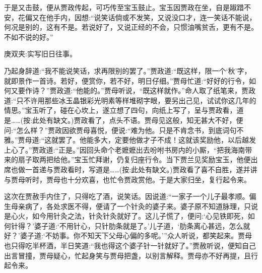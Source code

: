 \begin{parag}
    于是又击鼓，便从贾政传起，可巧传至宝玉鼓止。宝玉因贾政在坐，自是踧踖不安，花偏又在他手内，因想:“说笑话倘或不发笑，又说没口才，连一笑话不能说，何况是别的，这有不是。若说好了，又说正经的不会，只惯油嘴贫舌，更有不是。不如不说的好。”\begin{note}庚双夹:实写旧日往事。\end{note}乃起身辞道:“我不能说笑话，求再限别的罢了。”贾政道:“既这样，限一个‘秋’字，就即景作一首诗。若好，便赏你，若不好，明日仔细。”贾母忙道:“好好的行令，如何又要作诗？”贾政道:“他能的。”贾母听说，“既这样就作。”命人取了纸笔来，贾政道:“只不许用那些冰玉晶银彩光明素等样堆砌字眼，要另出己见，试试你这几年的情思。”宝玉听了，碰在心坎上，遂立想了四句，向纸上写了，呈与贾政看，道是……(按:此处有缺文。)贾政看了，点头不语。贾母见这般，知无甚大不好，便问:“怎么样？”贾政因欲贾母喜悦，便说:“难为他。只是不肯念书，到底词句不雅。”贾母道:“这就罢了。他能多大，定要他做才子不成！这就该奖励他，以后越发上心了。”贾政道:“正是。”因回头命个老嬷嬷出去吩咐书房内的小厮，“把我海南带来的扇子取两把给他。”宝玉忙拜谢，仍复归座行令。当下贾兰见奖励宝玉，他便出席也做一首递与贾政看时，写道是……(按:此处有缺文。)贾政看了喜不自胜，遂并讲与贾母听时，贾母也十分欢喜，也忙令贾政赏他。于是大家归坐，复行起令来。
\end{parag}


\begin{parag}
    这次在贾赦手内住了，只得吃了酒，说笑话。因说道:“一家子一个儿子最孝顺。偏生母亲病了，各处求医不得，便请了一个针灸的婆子来。婆子原不知道脉理，只说是心火，如今用针灸之法，针灸针灸就好了。这儿子慌了，便问:‘心见铁即死，如何针得？’婆子道:‘不用针心，只针肋条就是了。’儿子道，‘肋条离心甚远，怎么就好？’婆子道:‘不妨事。你不知天下父母心偏的多呢。’”众人听说，都笑起来。贾母也只得吃半杯酒，半日笑道:“我也得这个婆子针一针就好了。”贾赦听说，便知自己出言冒撞，贾母疑心，忙起身笑与贾母把盏，以别言解释。贾母亦不好再提，且行起令来。
\end{parag}


